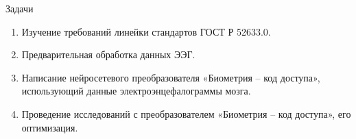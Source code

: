 \begin{frame}{Задачи}
	\begin{enumerate}
		\item Изучение требований линейки стандартов ГОСТ Р 52633.0.
		\item Предварительная обработка данных ЭЭГ.
		\item Написание нейросетевого преобразователя «Биометрия – код доступа»,
			использующий данные электроэнцефалограммы мозга.
		\item Проведение исследований с преобразователем «Биометрия – код доступа», его оптимизация.
	\end{enumerate}
\end{frame}
